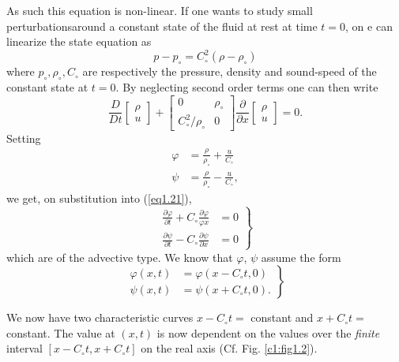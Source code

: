 As such this equation is non-linear. If one wants to study small
perturbations\pageoriginale around a constant state of the fluid at
rest at time $t=0$, on e can linearize the state equation as 
\begin{equation*}
p - p_\circ = {C}^2_\circ (\rho - \rho_\circ) 
\tag{1.20}\label{eq1.20}
\end{equation*}
where $p_\circ, \rho_\circ , C_\circ$ are respectively the
pressure, density and sound-speed of the constant state at $t=0$. By
neglecting second order terms one can then write
\begin{equation*}
\frac{D}{Dt} \begin{bmatrix}
\rho\\u
\end{bmatrix} + 
\begin{bmatrix}
0 & \rho_\circ\\
C^2_\circ/ \rho_\circ & 0
\end{bmatrix} \frac{\partial}{\partial x} \begin{bmatrix}
\rho\\
u
\end{bmatrix} = 0.
\tag{1.21}\label{eq1.21}
\end{equation*}
Setting
\begin{align*}
\varphi & = \frac{\rho}{\rho_\circ} + \frac{u}{C_\circ}\\
\psi & = \frac{\rho}{\rho_\circ} - \frac{u}{C_\circ},
\end{align*}
we get, on substitution into (\ref{eq1.21}),
\begin{equation*}
\left.\begin{aligned}
 \frac{\partial \varphi}{\partial t} + C_\circ \frac{\partial
  \varphi}{\varphi x} & = 0\\
\frac{\partial \psi}{\partial t} - C_\circ \frac{\partial
  \psi}{\partial x} & = 0
\end{aligned}
\right\}
\tag{1.22}\label{eq1.22}
\end{equation*}
which are of the advective type. We know that $\varphi$, $\psi$ assume
the form
\begin{equation*}
\left.
\begin{aligned}
\varphi (x,t) & = \varphi (x-C_\circ t, 0)\\
\psi (x,t) & = \psi (x + C_\circ t, 0).
\end{aligned} \right\}
\tag{1.23}\label{eq1.23}
\end{equation*}

We now have two characteristic curves $x - C_\circ t =$ constant and
$x + C_\circ t = $ constant. The value at $(x,t)$ is now dependent on
the values over the {\em finite} interval $[ x -C_\circ t, x + C_\circ
t]$ on the real axis (Cf. Fig. \ref{c1:fig1.2}). 

